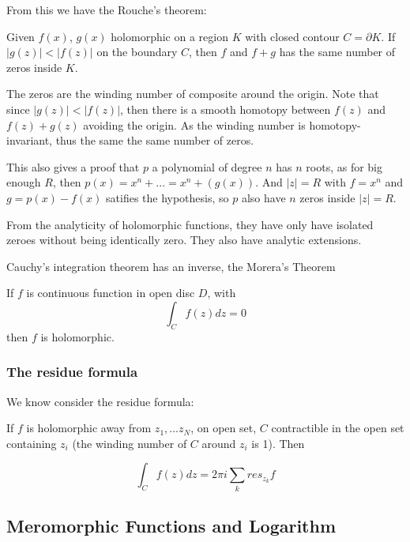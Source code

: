 \documentclass[main.tex]{subfiles}
\begin{document}
From this we have the Rouche's theorem:

\begin{theorem}
Given $f(x)$, $g(x)$ holomorphic on a region $K$ with closed contour $C = \partial K$. If $|g(z)| < |f(z)|$ on the boundary $C$, then $f$ and $f + g$ has the same number of zeros inside $K$.
\end{theorem}

\begin{theorem}
The zeros are the winding number of composite around the origin. Note that since $|g(z)| < |f(z)|$, then there is a smooth homotopy between $f(z)$ and $f(z) + g(z)$ avoiding the origin. As the winding number is homotopy-invariant, thus the same the same number of zeros.
\end{theorem}

\begin{remark}
This also gives a proof that $p$ a polynomial of degree $n$ has $n$ roots, as for big enough $R$, then $p(x) = x^n + ... = x^n + (g(x))$. And $|z| = R$ with $f = x^n$ and $g = p(x) - f(x)$ satifies the hypothesis, so $p$ also have $n$ zeros inside $|z| = R$.
\end{remark}

From the analyticity of holomorphic functions, they have only have isolated zeroes without being identically zero. They also have analytic extensions.

Cauchy's integration theorem has an inverse, the Morera's Theorem
\begin{theorem}
If $f$ is continuous function in open disc $D$, with 
$$
\int_C f(z) dz = 0
$$
then $f$ is holomorphic.
\end{theorem}

\subsubsection{The residue formula}
We know consider the residue formula:

\begin{theorem}
If $f$ is holomorphic away from $z_1, ... z_N$, on open set, $C$ contractible in the open set containing $z_i$ (the winding number of $C$ around $z_i$ is 1). Then 

$$
\int_C f(z) dz = 2\pi i \sum_k res_{z_k} f
$$
\end{theorem}

\subsection{Meromorphic Functions and Logarithm}
\end{document}
